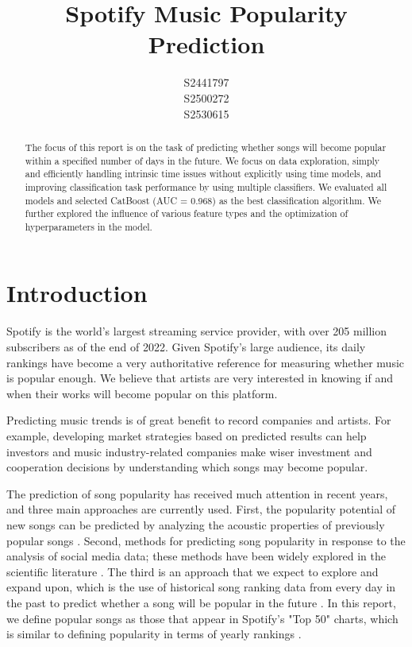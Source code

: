 \documentclass{article}
\title{Spotify Music Popularity Prediction}
\author{
  S2441797\\
  \And
  S2500272\\
 \And
  S2530615\\
}
\begin{document}
\maketitle

\begin{abstract}
The focus of this report is on the task of predicting whether songs will become popular within a specified number of days in the future. We focus on data exploration, simply and efficiently handling intrinsic time issues without explicitly using time models, and improving classification task performance by using multiple classifiers. We evaluated all models and selected CatBoost (AUC = 0.968) as the best classification algorithm. We further explored the influence of various feature types and the optimization of hyperparameters in the model.
\end{abstract}

\section{Introduction}
Spotify is the world's largest streaming service provider, with over 205 million subscribers as of the end of 2022\cite{usercounts}. Given Spotify's large audience, its daily rankings have become a very authoritative reference for measuring whether music is popular enough. We believe that artists are very interested in knowing if and when their works will become popular on this platform.

Predicting music trends is of great benefit to record companies and artists. For example, developing market strategies based on predicted results can help investors and music industry-related companies make wiser investment and cooperation decisions by understanding which songs may become popular.

The prediction of song popularity has received much attention in recent years, and three main approaches are currently used. First, the popularity potential of new songs can be predicted by analyzing the acoustic properties of previously popular songs \cite{8327835}. Second, methods for predicting song popularity in response to the analysis of social media data; these methods have been widely explored in the scientific literature \cite{shulman2016predictability}. The third is an approach that we expect to explore and expand upon, which is the use of historical song ranking data from every day in the past to predict whether a song will be popular in the future \cite{8999039}. In this report, we define popular songs as those that appear in Spotify's "Top 50" charts, which is similar to defining popularity in terms of yearly rankings \cite{881888}.
\end{document}

